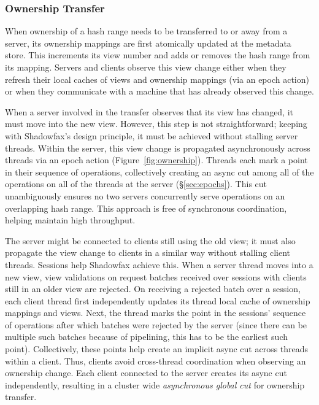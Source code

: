 \subsubsection{Ownership Transfer}
\label{design:ownership-tx}

When ownership of a hash range needs to be transferred to or away from a
server, its ownership mappings are first atomically updated at the
metadata store.
%
This increments its view number and adds or removes the hash range from
its mapping.
%
Servers and clients observe this view change either when they refresh
their local caches of views and ownership mappings (via an epoch action) or
when they communicate with a machine that has already observed this change.

When a server involved in the transfer observes that its view has
changed, it must move into the new view.
%
However, this step is not straightforward; keeping with
Shadowfax's design principle, it must be achieved without stalling
server threads.
%
%
%
Within the server, this view change is propagated asynchronously across
threads via an epoch action (Figure~\ref{fig:ownership}).
%
Threads each mark a point in their sequence of operations, collectively creating
an async cut among all of the operations on all of the threads at the server
(\S\ref{sec:epochs}).
%
This cut unambiguously ensures no two servers concurrently
serve operations on an overlapping hash range.
%
This approach is free of synchronous coordination, helping maintain high
throughput.

The server might be connected to clients still using the old view; it must also
propagate the view change to clients in a similar way without stalling client
threads.
%
Sessions help Shadowfax achieve this.
%
%
When a server thread moves into a new view, view validations on request
batches received over sessions with clients still in an older view
are rejected.
%
%
%
On receiving a rejected batch over a session, each client thread first
independently updates its thread local cache of ownership mappings and
views.
%
Next, the thread marks the point in the sessions' sequence of
operations after which batches were rejected by the server (since there
can be multiple such batches because of pipelining, this has to be
the earliest such point).
%
Collectively, these points help create an implicit async cut across
threads within a
client.
%
Thus, clients avoid cross-thread
coordination when observing an ownership change.
%
Each client connected to the server creates its async cut independently,
resulting in a cluster wide \emph{asynchronous global cut} for ownership
transfer.

